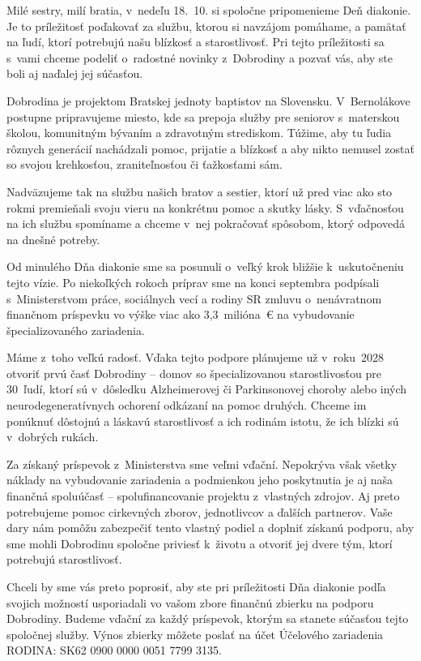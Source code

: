 Milé sestry, milí bratia, v~nedeľu 18.~10. si spoločne pripomenieme Deň diakonie. Je to príležitosť poďakovať za službu, ktorou si navzájom pomáhame, a pamätať na ľudí, ktorí potrebujú našu blízkosť a starostlivosť. Pri tejto príležitosti sa s~vami chceme podeliť o~radostné novinky z~Dobrodiny a pozvať vás, aby ste boli aj naďalej jej súčasťou.

Dobrodina je projektom Bratskej jednoty baptistov na Slovensku. V~Bernolákove postupne pripravujeme miesto, kde sa prepoja služby pre seniorov s~materskou školou, komunitným bývaním a zdravotným strediskom. Túžime, aby tu ľudia rôznych generácií nachádzali pomoc, prijatie a blízkosť a aby nikto nemusel zostať so svojou krehkosťou, zraniteľnosťou či ťažkosťami sám.

Nadväzujeme tak na službu našich bratov a sestier, ktorí už pred viac ako sto rokmi premieňali svoju vieru na konkrétnu pomoc a skutky lásky. S~vďačnosťou na ich službu spomíname a chceme v~nej pokračovať spôsobom, ktorý odpovedá na dnešné potreby.

Od minulého Dňa diakonie sme sa posunuli o~veľký krok bližšie k~uskutočneniu tejto vízie. Po niekoľkých rokoch príprav sme na konci septembra podpísali
s~Ministerstvom práce, sociálnych vecí a rodiny SR zmluvu o~nenávratnom finančnom príspevku vo výške viac ako 3,3~milióna~€ na vybudovanie špecializovaného zariadenia.

Máme z~toho veľkú radosť. Vďaka tejto podpore plánujeme už v~roku~2028 otvoriť prvú časť Dobrodiny -- domov so špecializovanou starostlivosťou pre 30~ľudí, ktorí sú v~dôsledku Alzheimerovej či Parkinsonovej choroby alebo iných neurodegeneratívnych ochorení odkázaní na pomoc druhých. Chceme im ponúknuť dôstojnú a láskavú starostlivosť a ich rodinám istotu, že ich blízki sú
v~dobrých rukách.

Za získaný príspevok z~Ministerstva sme veľmi vďační. Nepokrýva však všetky náklady na vybudovanie zariadenia a podmienkou jeho poskytnutia je aj naša finančná spoluúčasť -- spolufinancovanie projektu z~vlastných zdrojov. Aj preto potrebujeme pomoc cirkevných zborov, jednotlivcov a ďalších partnerov. Vaše dary nám pomôžu zabezpečiť tento vlastný podiel a doplniť získanú podporu, aby sme mohli Dobrodinu spoločne priviesť k~životu a otvoriť jej dvere tým, ktorí potrebujú starostlivosť.

Chceli by sme vás preto poprosiť, aby ste pri príležitosti Dňa diakonie podľa svojich možností usporiadali vo vašom zbore finančnú zbierku na podporu Dobrodiny. Budeme vďační za každý príspevok, ktorým sa stanete súčasťou tejto spoločnej služby. Výnos zbierky môžete poslať na účet Účelového zariadenia RODINA: SK62 0900 0000 0051 7799 3135.

